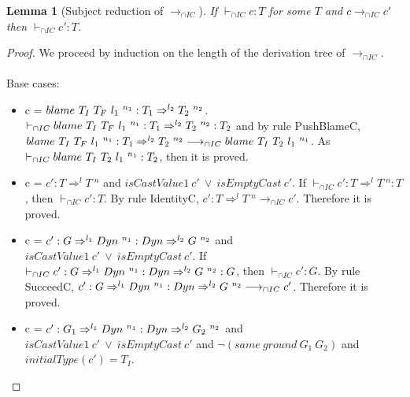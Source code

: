 \documentclass[a4paper]{article}
\newtheorem{lemma}{Lemma}
\begin{document}
\begin{lemma}[Subject reduction of $\longrightarrow_{\cap IC}$]
\label{subjectreductionIC}
If $\vdash_{\cap IC} c : T$ for some $T$ and $c \longrightarrow_{\cap IC} c'$ then $\vdash_{\cap IC} c' : T$.
\end{lemma}
\begin{proof}
We proceed by induction on the length of the derivation tree of $\longrightarrow_{\cap IC}$.\\\\
Base cases:
\begin{itemize}
    \item c = $blame\ T_I\ T_F\ l_1\ ^{n_1} : T_1 \Rightarrow^{l_2} T_2\ ^{n_2}$.
    $\vdash_{\cap IC} blame\ T_I\ T_F\ l_1\ ^{n_1} : T_1 \Rightarrow^{l_2} T_2\ ^{n_2} : T_2$ and by rule PushBlameC, $blame\ T_I\ T_F\ l_1\ ^{n_1} : T_1 \Rightarrow^{l_2} T_2\ ^{n_2} \longrightarrow_{\cap IC} blame\ T_I\ T_2\ l_1\ ^{n_1}$.
    As $\vdash_{\cap IC} blame\ T_I\ T_2\ l_1\ ^{n_1} : T_2$, then it is proved.
    \begin{comment}
    \item c = $\stuckcast{T_I}{T_F}{n_1} : T_1 \Rightarrow^{l} T_2\ ^{n_2}$.
    $\vdash_{\cap IC} \stuckcast{T_I}{T_F}{n_1} : T_1 \Rightarrow^{l} T_2\ ^{n_2} : T_2$ and by rule PushStuckC, $\stuckcast{T_I}{T_F}he{n_1} : T_1 \Rightarrow^{l} T_2\ ^{n_2} \longrightarrow_{\cap IC} \stuckcast{T_I}{T_2}{n_1}$.
    As $\vdash_{\cap IC} \stuckcast{T_I}{T_2}{n_1} : T_2$, then it is proved.
    \end{comment}
    \item c = $c' : T \Rightarrow^l T\ ^n$ and $isCastValue1\ c'\ \lor\ isEmptyCast\ c'$.
    If $\vdash_{\cap IC} c' : T \Rightarrow^l T\ ^n : T$, then $\vdash_{\cap IC} c' : T$.
    By rule IdentityC, $c' : T \Rightarrow^l T\ ^n \longrightarrow_{\cap IC} c'$.
    Therefore it is proved.
    \item c = $c' : G \Rightarrow^{l_1} \Dyn\ ^{n_1} : \Dyn \Rightarrow^{l_2} G\ ^{n_2}$ and $isCastValue1\ c'\ \lor\ isEmptyCast\ c'$.
    If $\vdash_{\cap IC} c' : G \Rightarrow^{l_1} Dyn\ ^{n_1} : Dyn \Rightarrow^{l_2} G\ ^{n_2} : G$, then $\vdash_{\cap IC} c' : G$.
    By rule SucceedC, $c' : G \Rightarrow^{l_1} Dyn\ ^{n_1} : Dyn \Rightarrow^{l_2} G\ ^{n_2} \longrightarrow_{\cap IC} c'$.
    Therefore it is proved.
    \item c = $c' : G_1 \Rightarrow^{l_1} \Dyn\ ^{n_1} : \Dyn \Rightarrow^{l_2} G_2\ ^{n_2}$ and $isCastValue1\ c'\ \lor\ isEmptyCast\ c'$ and $\neg(same\ ground\ G_1\ G_2)$ and $initialType(c') = T_I$.

\end{itemize}
\end{proof}
\end{document}
